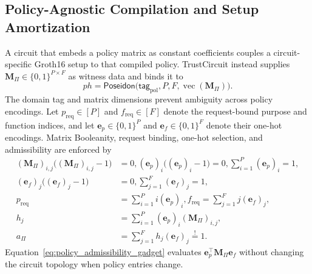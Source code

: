 \documentclass[10pt,journal,compsoc]{IEEEtran}
\begin{document}
\subsection{Policy-Agnostic Compilation and Setup Amortization}
\label{subsec:setup_policy}

A circuit that embeds a policy matrix as constant coefficients couples a circuit-specific Groth16 setup to that compiled policy. TrustCircuit instead supplies $\mathbf{M}_{\Pi}\in\{0,1\}^{P\times F}$ as witness data and binds it to
\begin{equation}
ph
=
\mathsf{Poseidon}
\bigl(
\mathsf{tag}_{\mathrm{pol}},
P,
F,
\operatorname{vec}(\mathbf{M}_{\Pi})
\bigr).
\label{eq:policy_commitment}
\end{equation}
The domain tag and matrix dimensions prevent ambiguity across policy encodings. Let $p_{\mathrm{req}}\in[P]$ and $f_{\mathrm{req}}\in[F]$ denote the request-bound purpose and function indices, and let
$\mathbf{e}_{p}\in\{0,1\}^{P}$ and $\mathbf{e}_{f}\in\{0,1\}^{F}$ denote their one-hot encodings. Matrix Booleanity, request binding, one-hot selection, and admissibility are enforced by
\begin{equation}
\begin{aligned}
(\mathbf{M}_{\Pi})_{i,j}
\bigl((\mathbf{M}_{\Pi})_{i,j}-1\bigr) &= 0,
(\mathbf{e}_{p})_i
\bigl((\mathbf{e}_{p})_i-1\bigr) = 0,
\sum_{i=1}^{P}(\mathbf{e}_{p})_i = 1,
\\
(\mathbf{e}_{f})_j
\bigl((\mathbf{e}_{f})_j-1\bigr) &= 0,
\sum_{j=1}^{F}(\mathbf{e}_{f})_j = 1,
\\
p_{\mathrm{req}} &= \sum_{i=1}^{P} i(\mathbf{e}_{p})_i,
f_{\mathrm{req}} = \sum_{j=1}^{F} j(\mathbf{e}_{f})_j,
\\
h_j &= \sum_{i=1}^{P}
(\mathbf{e}_{p})_i(\mathbf{M}_{\Pi})_{i,j},
\\
a_{\Pi} &= \sum_{j=1}^{F}
h_j(\mathbf{e}_{f})_j
\overset{!}{=} 1 .
\end{aligned}
\label{eq:policy_admissibility_gadget}
\end{equation}
Equation~\eqref{eq:policy_admissibility_gadget} evaluates $\mathbf{e}_{p}^{\top}\mathbf{M}_{\Pi}\mathbf{e}_{f}$ without changing the circuit topology when policy entries change.
\end{document}
